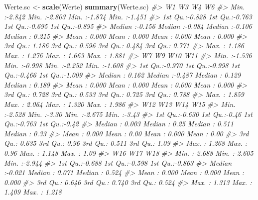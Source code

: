 \documentclass[12pt,ngerman,]{book}
\makeatletter
\newenvironment{Shaded}{\begin{snugshade}}{\end{snugshade}}
\newcommand{\KeywordTok}[1]{\textcolor[rgb]{0.13,0.29,0.53}{\textbf{{#1}}}}
\newcommand{\StringTok}[1]{\textcolor[rgb]{0.31,0.60,0.02}{{#1}}}
\newcommand{\CommentTok}[1]{\textcolor[rgb]{0.56,0.35,0.01}{\textit{{#1}}}}
\newcommand{\NormalTok}[1]{{#1}}
\newenvironment{kframe}{%
\medskip{}
\setlength{\fboxsep}{.8em}
 \def\at@end@of@kframe{}%
 \ifinner\ifhmode%
  \def\at@end@of@kframe{\end{minipage}}%
  \begin{minipage}{\columnwidth}%
 \fi\fi%
 \def\FrameCommand##1{\hskip\@totalleftmargin \hskip-\fboxsep
 \colorbox{shadecolor}{##1}\hskip-\fboxsep
     \hskip-\linewidth \hskip-\@totalleftmargin \hskip\columnwidth}%
 \MakeFramed {\advance\hsize-\width
   \@totalleftmargin\z@ \linewidth\hsize
   \@setminipage}}%
 {\par\unskip\endMakeFramed%
 \at@end@of@kframe}
\renewenvironment{Shaded}{\begin{kframe}}{\end{kframe}}
\makeatother
\begin{document}
\begin{Shaded}
\begin{Highlighting}[]
\NormalTok{Werte.sc <-}\StringTok{ }\KeywordTok{scale}\NormalTok{(Werte)}
\KeywordTok{summary}\NormalTok{(Werte.sc)}
\CommentTok{#>        W1               W3               W4               W6        }
\CommentTok{#>  Min.   :-2.842   Min.   :-2.803   Min.   :-1.874   Min.   :-1.451  }
\CommentTok{#>  1st Qu.:-0.828   1st Qu.:-0.763   1st Qu.:-0.695   1st Qu.:-0.895  }
\CommentTok{#>  Median :-0.156   Median :-0.084   Median :-0.106   Median : 0.215  }
\CommentTok{#>  Mean   : 0.000   Mean   : 0.000   Mean   : 0.000   Mean   : 0.000  }
\CommentTok{#>  3rd Qu.: 1.186   3rd Qu.: 0.596   3rd Qu.: 0.484   3rd Qu.: 0.771  }
\CommentTok{#>  Max.   : 1.186   Max.   : 1.276   Max.   : 1.663   Max.   : 1.881  }
\CommentTok{#>        W7               W9              W10              W11        }
\CommentTok{#>  Min.   :-1.536   Min.   :-0.998   Min.   :-2.252   Min.   :-1.608  }
\CommentTok{#>  1st Qu.:-0.970   1st Qu.:-0.998   1st Qu.:-0.466   1st Qu.:-1.009  }
\CommentTok{#>  Median : 0.162   Median :-0.487   Median : 0.129   Median : 0.189  }
\CommentTok{#>  Mean   : 0.000   Mean   : 0.000   Mean   : 0.000   Mean   : 0.000  }
\CommentTok{#>  3rd Qu.: 0.728   3rd Qu.: 0.533   3rd Qu.: 0.725   3rd Qu.: 0.788  }
\CommentTok{#>  Max.   : 1.859   Max.   : 2.064   Max.   : 1.320   Max.   : 1.986  }
\CommentTok{#>       W12              W13             W14              W15       }
\CommentTok{#>  Min.   :-2.528   Min.   :-3.30   Min.   :-2.675   Min.   :-3.43  }
\CommentTok{#>  1st Qu.:-0.630   1st Qu.:-0.46   1st Qu.:-0.763   1st Qu.:-0.42  }
\CommentTok{#>  Median : 0.003   Median : 0.25   Median : 0.511   Median : 0.33  }
\CommentTok{#>  Mean   : 0.000   Mean   : 0.00   Mean   : 0.000   Mean   : 0.00  }
\CommentTok{#>  3rd Qu.: 0.635   3rd Qu.: 0.96   3rd Qu.: 0.511   3rd Qu.: 1.09  }
\CommentTok{#>  Max.   : 1.268   Max.   : 0.96   Max.   : 1.148   Max.   : 1.09  }
\CommentTok{#>       W16              W17              W18        }
\CommentTok{#>  Min.   :-2.688   Min.   :-2.605   Min.   :-2.944  }
\CommentTok{#>  1st Qu.:-0.688   1st Qu.:-0.598   1st Qu.:-0.863  }
\CommentTok{#>  Median :-0.021   Median : 0.071   Median : 0.524  }
\CommentTok{#>  Mean   : 0.000   Mean   : 0.000   Mean   : 0.000  }
\CommentTok{#>  3rd Qu.: 0.646   3rd Qu.: 0.740   3rd Qu.: 0.524  }
\CommentTok{#>  Max.   : 1.313   Max.   : 1.409   Max.   : 1.218}
\end{Highlighting}
\end{Shaded}
\end{document}
